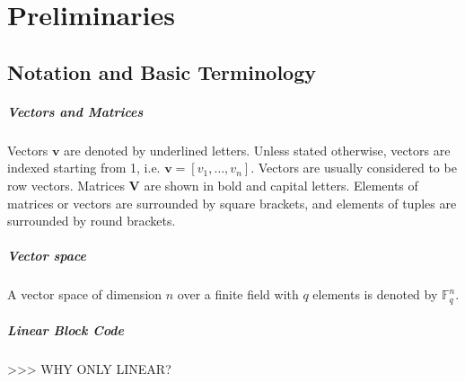 \chapter{Preliminaries} \label{chap:preliminaries}

\section{Notation and Basic Terminology}

\paragraph{Vectors and Matrices}

Vectors $\boldsymbol{v}$ are denoted by underlined letters. Unless
stated otherwise, vectors are indexed starting from 1, i.e. $\boldsymbol{v}=\left[v_{1},\ldots,v_{n}\right]$.
Vectors are usually considered to be row vectors. Matrices $\boldsymbol{V}$
are shown in bold and capital letters. Elements of matrices or vectors
are surrounded by square brackets, and elements of tuples are surrounded
by round brackets.

\paragraph{Vector space}

A vector space of dimension $n$ over a finite field with $q$ elements
is denoted by $\ensuremath{\mathbb{F}}_{q}^{n}$. 

\paragraph{Linear Block Code}

>\textcompwordmark >\textcompwordmark > WHY ONLY LINEAR?

